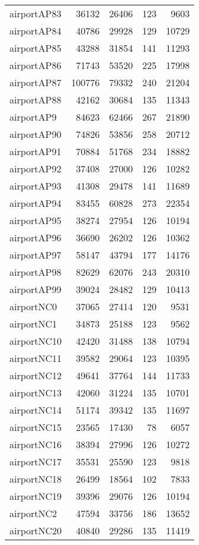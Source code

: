 \begin{tabular}{lrrrr}
airportAP83 & 36132 & 26406 & 123 & 9603 \\
airportAP84 & 40786 & 29928 & 129 & 10729 \\
airportAP85 & 43288 & 31854 & 141 & 11293 \\
airportAP86 & 71743 & 53520 & 225 & 17998 \\
airportAP87 & 100776 & 79332 & 240 & 21204 \\
airportAP88 & 42162 & 30684 & 135 & 11343 \\
airportAP9 & 84623 & 62466 & 267 & 21890 \\
airportAP90 & 74826 & 53856 & 258 & 20712 \\
airportAP91 & 70884 & 51768 & 234 & 18882 \\
airportAP92 & 37408 & 27000 & 126 & 10282 \\
airportAP93 & 41308 & 29478 & 141 & 11689 \\
airportAP94 & 83455 & 60828 & 273 & 22354 \\
airportAP95 & 38274 & 27954 & 126 & 10194 \\
airportAP96 & 36690 & 26202 & 126 & 10362 \\
airportAP97 & 58147 & 43794 & 177 & 14176 \\
airportAP98 & 82629 & 62076 & 243 & 20310 \\
airportAP99 & 39024 & 28482 & 129 & 10413 \\
airportNC0 & 37065 & 27414 & 120 & 9531 \\
airportNC1 & 34873 & 25188 & 123 & 9562 \\
airportNC10 & 42420 & 31488 & 138 & 10794 \\
airportNC11 & 39582 & 29064 & 123 & 10395 \\
airportNC12 & 49641 & 37764 & 144 & 11733 \\
airportNC13 & 42060 & 31224 & 135 & 10701 \\
airportNC14 & 51174 & 39342 & 135 & 11697 \\
airportNC15 & 23565 & 17430 & 78 & 6057 \\
airportNC16 & 38394 & 27996 & 126 & 10272 \\
airportNC17 & 35531 & 25590 & 123 & 9818 \\
airportNC18 & 26499 & 18564 & 102 & 7833 \\
airportNC19 & 39396 & 29076 & 126 & 10194 \\
airportNC2 & 47594 & 33756 & 186 & 13652 \\
airportNC20 & 40840 & 29286 & 135 & 11419 \\

\end{tabular}
